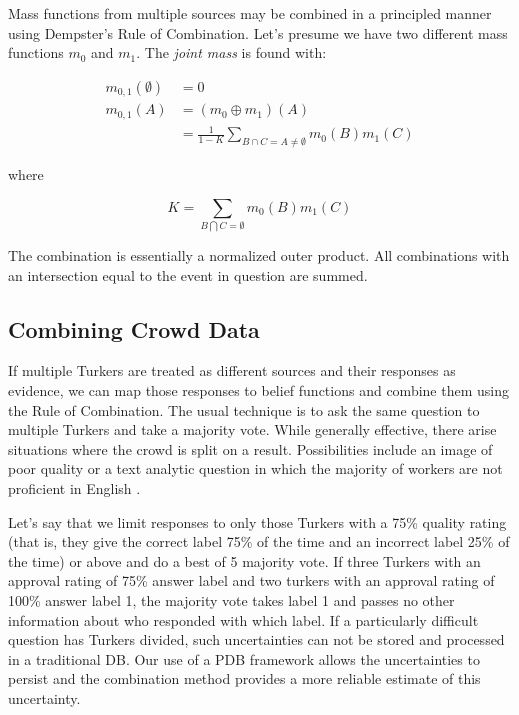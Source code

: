 Mass functions from multiple sources may be combined in a principled manner using Dempster's Rule of Combination.  Let's presume we have two different mass functions $m_{0}$ and $m_{1}$.  The \textit{joint mass} is found with:

\begin{equation}
\begin{split}
m_{0,1}(\emptyset) &=0\\
m_{0,1}(A) &=(m_{0}\oplus m_{1})(A)\\
                   &=\frac{1}{1-K} \sum_{B\cap C=A\neq\emptyset} m_{0}(B)m_{1}(C)
\end{split}
\end{equation}

where

\begin{equation}
K=\sum_{B\bigcap C=\emptyset}m_{0}(B)m_{1}(C)
\end{equation}

The combination is essentially a normalized outer product.  All combinations with an intersection equal to the event in question are summed.
 
\subsection{Combining Crowd Data}

If multiple Turkers are treated as different sources and their responses as evidence, we can map those responses to belief functions and combine them using the Rule of Combination.  The usual technique is to ask the same question to multiple Turkers and take a majority vote.  While generally effective, there arise situations where the crowd is split on a result.  Possibilities include an image of poor quality or a text analytic question in which the majority of workers are not proficient in English \cite{Rashtchian:2010:CIA:1866696.1866717}.

Let's say that we limit responses to only those Turkers with a 75\% quality rating (that is, they give the correct label 75\% of the time and an incorrect label 25\% of the time) or above and do a best of 5 majority vote.  If three Turkers with an approval rating of 75\% answer label  and two turkers with an approval rating of 100\% answer label 1, the majority vote takes label 1 and passes no other information about who responded with which label.  If a particularly difficult question has Turkers divided, such uncertainties can not be stored and processed in a traditional DB.  Our use of a PDB framework allows the uncertainties to persist and the combination method provides a more reliable estimate of this uncertainty. 


